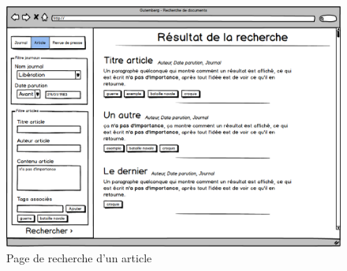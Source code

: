     \begin{figure}[H]
        \centering
        \includegraphics[width=\textwidth]{figures/recherche.png}
            \caption{Page de recherche d'un article}
            \label{fig:recherche_img}
    \end{figure}
